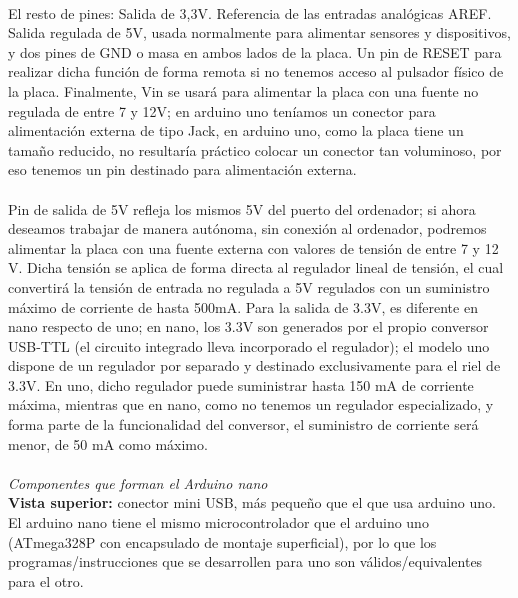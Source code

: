 \documentclass[12pt]{article}
\begin{document}
	 \\
		
	\noindent El resto de pines: Salida de 3,3V. Referencia de las entradas analógicas AREF. Salida regulada de 5V, usada normalmente para alimentar sensores y dispositivos, y dos pines de GND o masa en ambos lados de la placa. Un pin de RESET para realizar dicha función de forma remota si no tenemos acceso al pulsador físico de la placa. Finalmente, Vin se usará para alimentar la placa con una fuente no regulada de entre 7 y 12V; en arduino uno teníamos un conector para alimentación externa de tipo Jack, en arduino uno, como la placa tiene un tamaño reducido, no resultaría práctico colocar un conector tan voluminoso, por eso tenemos un pin destinado para alimentación externa. \\
	
	 \\
	
	\noindent Pin de salida de 5V refleja los mismos 5V del puerto  del ordenador; si ahora deseamos trabajar de manera autónoma, sin conexión al ordenador, podremos alimentar la placa con una fuente externa con valores de tensión de entre 7 y 12 V. Dicha tensión se aplica de forma directa al regulador lineal de tensión, el cual convertirá la tensión de entrada no regulada a 5V regulados con un suministro máximo de corriente de hasta 500mA. Para la salida de 3.3V, es diferente en nano respecto de uno; en nano, los 3.3V son generados por el propio conversor USB-TTL (el circuito integrado lleva incorporado el regulador); el modelo uno dispone de un regulador por separado y destinado exclusivamente para el riel de 3.3V. En uno, dicho regulador puede suministrar hasta 150 mA de corriente máxima, mientras que en nano, como no tenemos un regulador especializado, y forma parte de la funcionalidad del conversor, el suministro de corriente será menor, de 50 mA como máximo. \\
	
	 \\
	
	\noindent \textit{Componentes que forman el Arduino nano} \\
	
	\noindent \textbf{Vista superior:} conector mini USB, más pequeño que el que usa arduino uno. El arduino nano tiene el mismo microcontrolador que el arduino uno (ATmega328P con encapsulado de montaje superficial), por lo que los programas/instrucciones que se desarrollen para uno son válidos/equivalentes para el otro. \\
	
\end{document}
